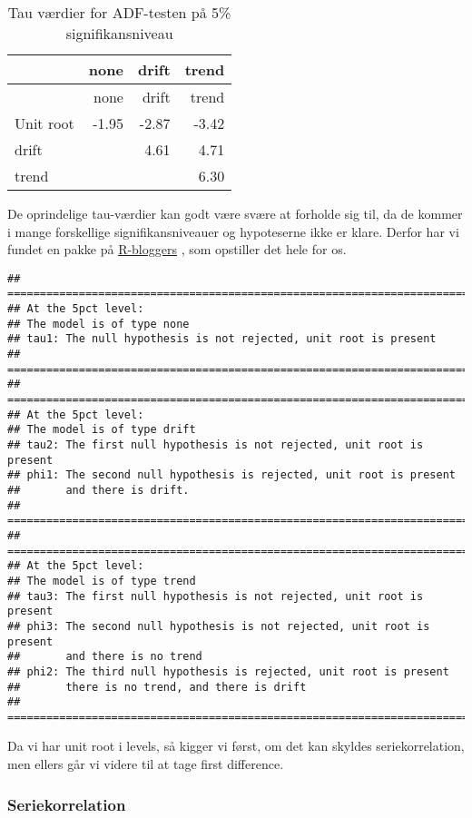 \documentclass[
  10pt,
]{article}
\begin{document}
\begin{longtable}[]{@{}lrrr@{}}
\caption{Tau værdier for ADF-testen på 5\%
signifikansniveau}\tabularnewline
\toprule
& none & drift & trend\tabularnewline
\midrule
\endfirsthead
\toprule
& none & drift & trend\tabularnewline
\midrule
\endhead
Unit root & -1.95 & -2.87 & -3.42\tabularnewline
drift & & 4.61 & 4.71\tabularnewline
trend & & & 6.30\tabularnewline
\bottomrule
\end{longtable}

De oprindelige tau-værdier kan godt være svære at forholde sig til, da
de kommer i mange forskellige signifikansniveauer og hypoteserne ikke er
klare. Derfor har vi fundet en pakke på
\href{https://www.r-bloggers.com/2021/12/easy-interpretations-of-adf-test-in-r/}{R-bloggers}
, som opstiller det hele for os.

\begin{verbatim}
## ========================================================================
## At the 5pct level:
## The model is of type none
## tau1: The null hypothesis is not rejected, unit root is present
## ========================================================================
## ========================================================================
## At the 5pct level:
## The model is of type drift
## tau2: The first null hypothesis is not rejected, unit root is present
## phi1: The second null hypothesis is rejected, unit root is present
##       and there is drift.
## ========================================================================
## ========================================================================
## At the 5pct level:
## The model is of type trend
## tau3: The first null hypothesis is not rejected, unit root is present
## phi3: The second null hypothesis is not rejected, unit root is present
##       and there is no trend
## phi2: The third null hypothesis is rejected, unit root is present
##       there is no trend, and there is drift
## ========================================================================
\end{verbatim}

Da vi har unit root i levels, så kigger vi først, om det kan skyldes
seriekorrelation, men ellers går vi videre til at tage first difference.

\newpage

\hypertarget{seriekorrelation}{%
\subsubsection{Seriekorrelation}\label{seriekorrelation}}
\end{document}
